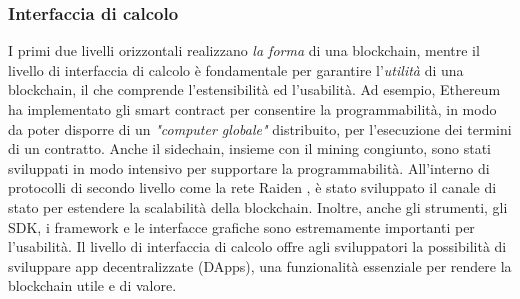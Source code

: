 \subsubsection{Interfaccia di calcolo}
I primi due livelli orizzontali realizzano \emph{la forma} di una blockchain, mentre il livello di interfaccia di calcolo è fondamentale per garantire l'\emph{utilità} di una blockchain, il che comprende l'estensibilità ed l'usabilità. Ad esempio, Ethereum ha implementato gli smart contract per consentire la programmabilità, in modo da poter disporre di un \emph{"computer globale"} distribuito, per l'esecuzione dei termini di un contratto. Anche il sidechain, insieme con il mining congiunto, sono stati sviluppati in modo intensivo per supportare la programmabilità. All'interno di protocolli di secondo livello come la rete Raiden \cite{c25}, è stato sviluppato il canale di stato per estendere la scalabilità della blockchain. Inoltre, anche gli strumenti, gli SDK, i framework e le interfacce grafiche sono estremamente importanti per l'usabilità. Il livello di interfaccia di calcolo offre agli sviluppatori la possibilità di sviluppare app decentralizzate (DApps), una funzionalità essenziale per rendere la blockchain utile e di valore.

